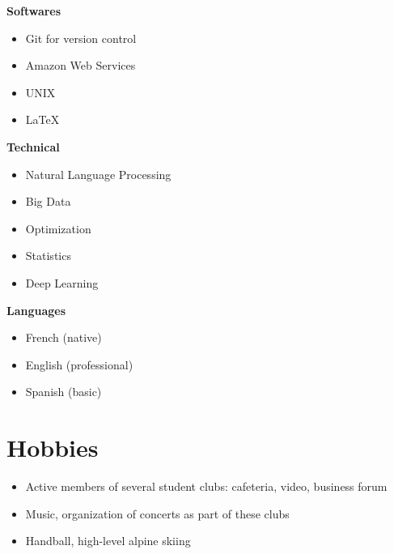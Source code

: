 \documentclass[a4paper,10.5pt]{article}
\begin{document}
\begin{paracol}{2}
\begin{rightcolumn}
			\textbf{Softwares}
			\begin{itemize}
				\item Git for version control
				\item Amazon Web Services
				\item UNIX
				\item \LaTeX
			\end{itemize}
			\vspace{0.2cm}
			
			\textbf{Technical}
			\begin{itemize}
				\item Natural Language Processing
				\item Big Data
				\item Optimization
				\item Statistics
				\item Deep Learning
			\end{itemize}
			\vspace{0.2cm}
			
			\textbf{Languages}
			\begin{itemize}
				\item French (native)
				\item English (professional)
				\item Spanish (basic)
			\end{itemize}
		
		\section*{Hobbies}
		\begin{itemize}
			\item Active members of several student clubs: cafeteria, video, business forum
			\item Music, organization of concerts as part of these clubs
			\item Handball, high-level alpine skiing
		\end{itemize}
			
		\end{rightcolumn}
		
	\end{paracol}
	
	
	
	
\end{document}
